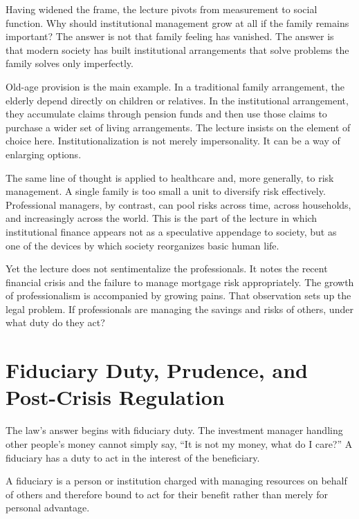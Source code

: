 Having widened the frame, the lecture pivots from measurement to social function. Why should institutional management grow at all if the family remains important? The answer is not that family feeling has vanished. The answer is that modern society has built institutional arrangements that solve problems the family solves only imperfectly.

Old-age provision is the main example. In a traditional family arrangement, the elderly depend directly on children or relatives. In the institutional arrangement, they accumulate claims through pension funds and then use those claims to purchase a wider set of living arrangements. The lecture insists on the element of choice here. Institutionalization is not merely impersonality. It can be a way of enlarging options.

The same line of thought is applied to healthcare and, more generally, to risk management. A single family is too small a unit to diversify risk effectively. Professional managers, by contrast, can pool risks across time, across households, and increasingly across the world. This is the part of the lecture in which institutional finance appears not as a speculative appendage to society, but as one of the devices by which society reorganizes basic human life.

Yet the lecture does not sentimentalize the professionals. It notes the recent financial crisis and the failure to manage mortgage risk appropriately. The growth of professionalism is accompanied by growing pains. That observation sets up the legal problem. If professionals are managing the savings and risks of others, under what duty do they act?

\section{Fiduciary Duty, Prudence, and Post-Crisis Regulation}

The law's answer begins with fiduciary duty. The investment manager handling other people's money cannot simply say, ``It is not my money, what do I care?'' A fiduciary has a duty to act in the interest of the beneficiary.

\begin{definition}
A fiduciary is a person or institution charged with managing resources on behalf of others and therefore bound to act for their benefit rather than merely for personal advantage.
\end{definition}

